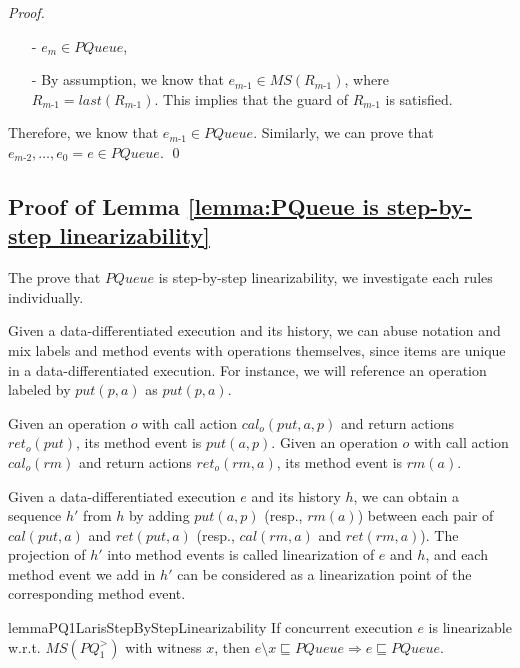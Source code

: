 \begin {proof}
\begin{itemize}
\setlength{\itemsep}{0.5pt}
\item[-] $e_m \in \textit{PQueue}$,

\item[-] By assumption, we know that $e_{\textit{m-1}} \in \textit{MS}(R_{\textit{m-1}})$, where $R_{\textit{m-1}} = \textit{last}(R_{\textit{m-1}})$. This implies that the guard of $R_{\textit{m-1}}$ is satisfied.
\end{itemize}

Therefore, we know that $e_{\textit{m-1}} \in \textit{PQueue}$. Similarly, we can prove that $e_{\textit{m-2}},\ldots,e_0 = e \in \textit{PQueue}$. \qed
\end {proof}



\subsection{Proof of Lemma \ref{lemma:PQueue is step-by-step linearizability}}


The prove that $\textit{PQueue}$ is step-by-step linearizability, we investigate each rules individually.

Given a data-differentiated execution and its history, we can abuse notation and mix labels and method events with operations themselves, since items are unique in a data-differentiated execution. For instance, we will reference an operation labeled by $\textit{put}(p,a)$ as $\textit{put}(p,a)$.


Given an operation $o$ with call action $\textit{cal}_o (\textit{put},a,p)$ and return actions $\textit{ret}_o (\textit{put})$, its method event is $\textit{put}(a,p)$. Given an operation $o$ with call action $\textit{cal}_o (\textit{rm})$ and return actions $\textit{ret}_o (\textit{rm},a)$, its method event is $\textit{rm}(a)$.

Given a data-differentiated execution $e$ and its history $h$, we can obtain a sequence $h'$ from $h$ by adding $\textit{put}(a,p)$ (resp., $\textit{rm}(a)$) between each pair of $\textit{cal}(\textit{put},a)$ and $\textit{ret}(\textit{put},a)$ (resp., $\textit{cal}(\textit{rm},a)$ and $\textit{ret}(\textit{rm},a)$). The projection of $h'$ into method events is called linearization of $e$ and $h$, and each method event we add in $h'$ can be considered as a linearization point of the corresponding method event.

\begin{restatable}{lemma}{PQ1LarisStepByStepLinearizability}
\label{lemma:PQ1Lar is step-by-step linearizability}
If concurrent execution $e$ is linearizable w.r.t. $\textit{MS}(\textit{PQ}_1^{>})$ with witness $x$, then $e \setminus x \sqsubseteq \textit{PQueue} \Rightarrow e \sqsubseteq \textit{PQueue}$.
\end{restatable}

